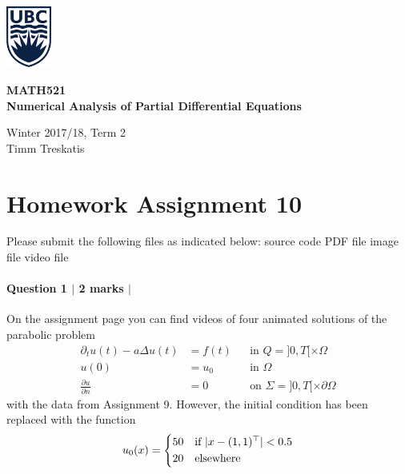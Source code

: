 \documentclass[10pt,letterpaper]{scrartcl}
\begin{document}
\begin{minipage}{.2\textwidth}
\includegraphics[width=42pt]{ubc-logo.png}
\end{minipage}
\hfill
\begin{minipage}{.75\textwidth}
\setlength{\parskip}{6pt}
\begin{flushright}
{\sffamily
\textbf{MATH521}\\
\textbf{Numerical Analysis of Partial Differential Equations}

Winter 2017/18, Term 2\\
Timm Treskatis
}
\end{flushright}
\end{minipage}

\section*{Homework Assignment 10}

Please submit the following files as indicated below: \hfill \faFileCodeO \: source code \hfill \faFilePdfO \: PDF file \hfill \faFilePictureO \: image file \hfill \faFileMovieO \: video file

\paragraph*{Question 1 $\vert$ 2 marks $\vert$ \faFilePdfO}

On the assignment page you can find videos of four animated solutions of the parabolic problem
\begin{equation}\tag{H}\label{eq:heat}
\begin{aligned}
\partial_t u(t) - a \Delta u(t) &= f(t) && \text{in } Q = ]0,T[ \times \Omega\\
u(0) &= u_0 && \text{in } \Omega\\
\frac{\partial u}{\partial n} &= 0 && \text{on } \Sigma = ]0,T[ \times \partial \Omega
\end{aligned}
\end{equation}
with the data from Assignment 9. However, the initial condition has been replaced with the function
\begin{equation*}
u_0(x) =
\begin{dcases*}
50 & if $\lvert x - (1,1)^\top \rvert < 0.5$\\
20 & elsewhere
\end{dcases*}
\end{equation*}
\end{document}
